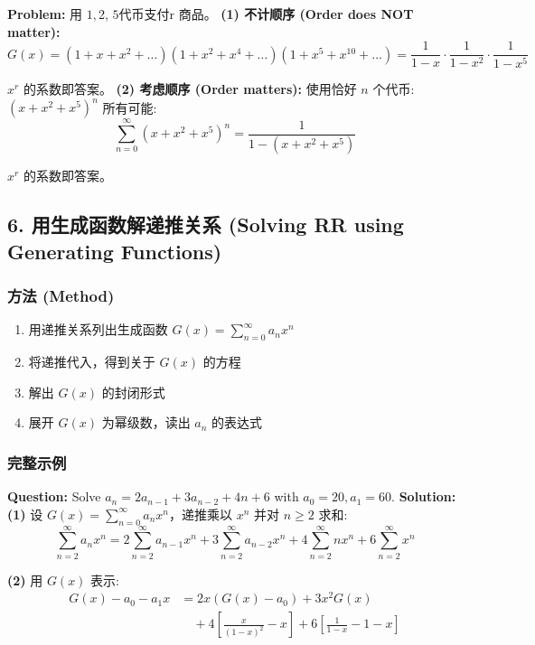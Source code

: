 \documentclass[10pt,a4paper,openany]{ctexbook}
\theoremstyle{definition}
\theoremstyle{remark}
\begin{document}
\textbf{Problem:} 用 $1, $2, $5 代币支付 $r 商品。
\textbf{(1) 不计顺序 (Order does NOT matter):}
\[
G(x) = (1 + x + x^2 + \dots)(1 + x^2 + x^4 + \dots)(1 + x^5 + x^{10} + \dots) = \frac{1}{1-x} \cdot \frac{1}{1-x^2} \cdot \frac{1}{1-x^5}
\]

$x^r$ 的系数即答案。
\textbf{(2) 考虑顺序 (Order matters):}
使用恰好 $n$ 个代币: $(x + x^2 + x^5)^n$
所有可能:
\[
\sum_{n=0}^\infty (x + x^2 + x^5)^n = \frac{1}{1 - (x + x^2 + x^5)}
\]

$x^r$ 的系数即答案。
\vspace{-2pt}

\subsection{6. 用生成函数解递推关系 (Solving RR using Generating Functions)}

\subsubsection{方法 (Method)}

\begin{enumerate}
\item 用递推关系列出生成函数 $G(x) = \sum_{n=0}^\infty a_n x^n$
\item 将递推代入，得到关于 $G(x)$ 的方程
\item 解出 $G(x)$ 的封闭形式
\item 展开 $G(x)$ 为幂级数，读出 $a_n$ 的表达式

\end{enumerate}

\subsubsection{完整示例}

\textbf{Question:} Solve $a_n = 2a_{n-1} + 3a_{n-2} + 4n + 6$ with $a_0 = 20, a_1 = 60$.
\textbf{Solution:}
\textbf{(1)} 设 $G(x) = \sum_{n=0}^\infty a_n x^n$，递推乘以 $x^n$ 并对 $n \ge 2$ 求和:
\[
\sum_{n=2}^\infty a_n x^n = 2\sum_{n=2}^\infty a_{n-1} x^n + 3\sum_{n=2}^\infty a_{n-2} x^n + 4\sum_{n=2}^\infty n x^n + 6\sum_{n=2}^\infty x^n
\]

\textbf{(2)} 用 $G(x)$ 表示:
\[
\begin{aligned}
G(x) - a_0 - a_1 x &= 2x(G(x) - a_0) + 3x^2 G(x) \\
&\quad + 4\left[\frac{x}{(1-x)^2} - x\right] + 6\left[\frac{1}{1-x} - 1 - x\right]
\end{aligned}
\]
\end{document}
